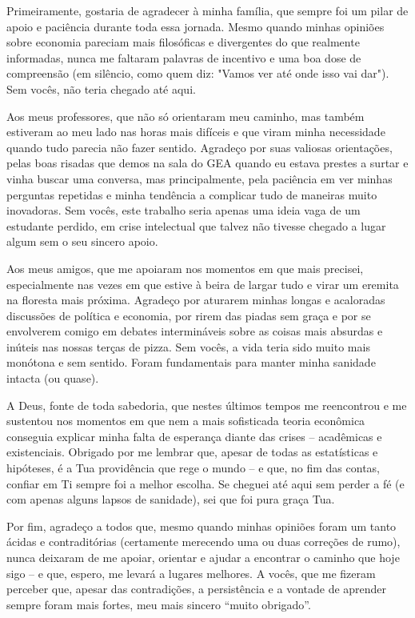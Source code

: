 \begin{agradecimentos}
    Primeiramente, gostaria de agradecer à minha família, que sempre foi um pilar de apoio e paciência durante toda essa jornada. Mesmo quando minhas opiniões sobre economia pareciam mais filosóficas e divergentes do que realmente informadas, nunca me faltaram palavras de incentivo e uma boa dose de compreensão (em silêncio, como quem diz: "Vamos ver até onde isso vai dar"). Sem vocês, não teria chegado até aqui.

    Aos meus professores, que não só orientaram meu caminho, mas também estiveram ao meu lado nas horas mais difíceis e que viram minha necessidade quando tudo parecia não fazer sentido. Agradeço por suas valiosas orientações, pelas boas risadas que demos na sala do GEA quando eu estava prestes a surtar e vinha buscar uma conversa, mas principalmente, pela paciência em ver minhas perguntas repetidas e minha tendência a complicar tudo de maneiras muito inovadoras. Sem vocês, este trabalho seria apenas uma ideia vaga de um estudante perdido, em crise intelectual que talvez não tivesse chegado a lugar algum sem o seu sincero apoio.
    
    Aos meus amigos, que me apoiaram nos momentos em que mais precisei, especialmente nas vezes em que estive à beira de largar tudo e virar um eremita na floresta mais próxima. Agradeço por aturarem minhas longas e acaloradas discussões de política e economia, por rirem das piadas sem graça e por se envolverem comigo em debates intermináveis sobre as coisas mais absurdas e inúteis nas nossas terças de pizza. Sem vocês, a vida teria sido muito mais monótona e sem sentido. Foram fundamentais para manter minha sanidade intacta (ou quase).

    A Deus, fonte de toda sabedoria, que nestes últimos tempos me reencontrou e me sustentou nos momentos em que nem a mais sofisticada teoria econômica conseguia explicar minha falta de esperança diante das crises – acadêmicas e existenciais. Obrigado por me lembrar que, apesar de todas as estatísticas e hipóteses, é a Tua providência que rege o mundo – e que, no fim das contas, confiar em Ti sempre foi a melhor escolha. Se cheguei até aqui sem perder a fé (e com apenas alguns lapsos de sanidade), sei que foi pura graça Tua.

    Por fim, agradeço a todos que, mesmo quando minhas opiniões foram um tanto ácidas e contraditórias (certamente merecendo uma ou duas correções de rumo), nunca deixaram de me apoiar, orientar e ajudar a encontrar o caminho que hoje sigo – e que, espero, me levará a lugares melhores. A vocês, que me fizeram perceber que, apesar das contradições, a persistência e a vontade de aprender sempre foram mais fortes, meu mais sincero “muito obrigado”.


\end{agradecimentos}
